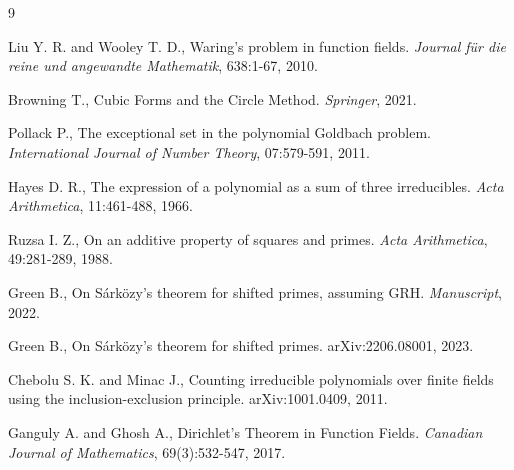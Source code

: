 \documentclass[11pt, reqno]{amsart}
\numberwithin{equation}{section}
\begin{document}
\begin{thebibliography}{9}

 Liu Y. R. and Wooley T. D., Waring's problem in function fields. \textit{Journal für die reine und angewandte Mathematik}, 638:1-67, 2010.

 Browning T., Cubic Forms and the Circle Method. \textit{Springer}, 2021.

 Pollack P., The exceptional set in the polynomial {G}oldbach problem. \textit{International Journal of Number Theory}, 07:579-591, 2011.

 Hayes D. R., The expression of a polynomial as a sum of three irreducibles. \textit{Acta Arithmetica}, 11:461-488, 1966.

 Ruzsa I. Z., On an additive property of squares and primes. \textit{Acta Arithmetica}, 49:281-289, 1988.

 Green B., On {S}árközy's theorem for shifted primes, assuming {GRH}. \textit{Manuscript}, 2022.

 Green B., On S\'ark\"ozy's theorem for shifted primes. arXiv:2206.08001, 2023.

 Chebolu S. K. and Minac J., Counting irreducible polynomials over finite fields using the inclusion-exclusion principle. arXiv:1001.0409, 2011.

 Ganguly A. and Ghosh A., Dirichlet’s Theorem in Function Fields. \textit{Canadian Journal of Mathematics}, 69(3):532-547, 2017.

\end{thebibliography}
\end{document}
